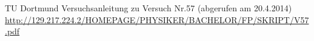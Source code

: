 \vfill

\begin{thebibliography}{WissOnl}
	 TU Dortmund Versuchsanleitung zu Versuch Nr.57 (abgerufen am 20.4.2014) \url{http://129.217.224.2/HOMEPAGE/PHYSIKER/BACHELOR/FP/SKRIPT/V57.pdf}
\end{thebibliography}





